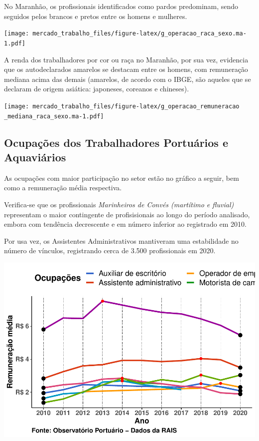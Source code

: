 \documentclass[
]{article}
\begin{document}
No Maranhão, os profissionais identificados como pardos predominam,
sendo seguidos pelos brancos e pretos entre os homens e mulheres.

\texttt{[image: mercado\_trabalho\_files/figure-latex/g\_operacao\_raca\_sexo.ma-1.pdf]}

A renda dos trabalhadores por cor ou raça no Maranhão, por sua vez,
evidencia que os autodeclarados amarelos se destacam entre os homens,
com remuneração mediana acima das demais (amarelos, de acordo com o
IBGE, são aqueles que se declaram de origem asiática: japoneses,
coreanos e chineses).

\texttt{[image: mercado\_trabalho\_files/figure-latex/g\_operacao\_remuneracao \_mediana\_raca\_sexo.ma-1.pdf]}

\hypertarget{ocupauxe7uxf5es-dos-trabalhadores-portuuxe1rios-e-aquaviuxe1rios}{%
\subsection{Ocupações dos Trabalhadores Portuários e
Aquaviários}\label{ocupauxe7uxf5es-dos-trabalhadores-portuuxe1rios-e-aquaviuxe1rios}}

As ocupações com maior participação no setor estão no gráfico a seguir,
bem como a remuneração média respectiva.

Verifica-se que os profissionais \emph{Marinheiros de Convés (martítimo
e fluvial)} representam o maior contingente de profisisionais ao longo
do período analisado, embora com tendência decrescente e em número
inferior ao registrado em 2010.

Por usa vez, os Assistentes Administrativos mantiveram uma estabilidade
no número de vínculos, registrando cerca de 3.500 profissionais em 2020.

\includegraphics{mercado_trabalho_files/figure-latex/g_operacao_ocupacao-1.pdf}
\end{document}
